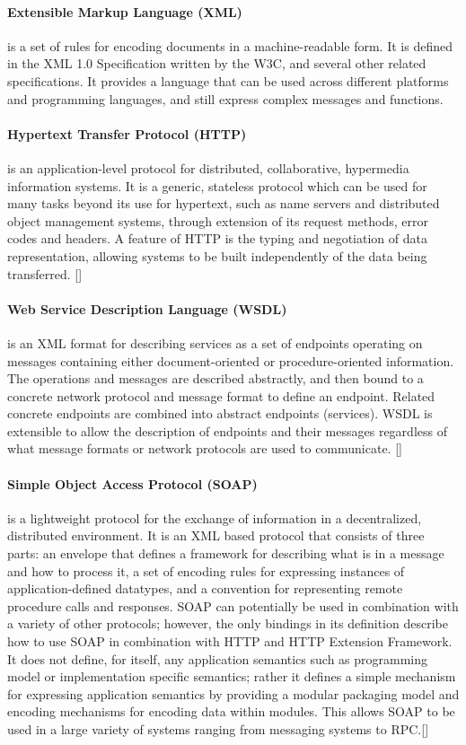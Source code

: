 \paragraph{Extensible Markup Language (XML)}
is a set of rules for encoding documents in a machine-readable form. It is defined in the XML 1.0 Specification written by the W3C, and several other related specifications. It provides a language that can be used across different platforms and programming languages, and still express complex messages and functions.

\paragraph{Hypertext Transfer Protocol (HTTP)} 
is an application-level protocol for distributed, collaborative, hypermedia information systems. It is a generic, stateless protocol which can be used for many tasks beyond its use for hypertext, such as name servers and distributed object management systems, through extension of its request methods, error codes and headers. A feature of HTTP is the typing and negotiation of data representation, allowing systems to be built independently of the data being transferred. [\citet{HTTP}]

\paragraph{Web Service Description Language (WSDL)}
is an XML format for describing services as a set of endpoints operating on messages containing either document-oriented or procedure-oriented information. The operations and messages are described abstractly, and then bound to a concrete network protocol and message format to define an endpoint. Related concrete endpoints are combined into abstract endpoints (services). WSDL is extensible to allow the description of endpoints and their messages regardless of what message formats or network protocols are used to communicate. [\citet{WSDL}]

\paragraph{Simple Object Access Protocol (SOAP)}
is a lightweight protocol for the exchange of information in a decentralized, distributed environment. It is an XML based protocol that consists of three parts: an envelope that defines a framework for describing what is in a message and how to process it, a set of encoding rules for expressing instances of application-defined datatypes, and a convention for representing remote procedure calls and responses. SOAP can potentially be used in combination with a variety of other protocols; however, the only bindings in its definition describe how to use SOAP in combination with HTTP and HTTP Extension Framework. It does not define, for itself, any application semantics such as programming model or implementation specific semantics; rather it defines a simple mechanism for expressing application semantics by providing a modular packaging model and encoding mechanisms for encoding data within modules. This allows SOAP to be used in a large variety of systems ranging from messaging systems to RPC.[\citet{SOAP}]

